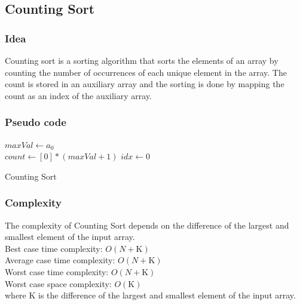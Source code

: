 \documentclass[11pt,a4paper]{article}
\begin{document}
\subsection{Counting Sort}
\subsubsection*{Idea}
Counting sort is a sorting algorithm that sorts the elements of an array by counting the number of occurrences of each unique element in the array. 
The count is stored in an auxiliary array and the sorting is done by mapping the count as an index of the auxiliary array.

\subsubsection*{Pseudo code}
\begin{algorithm2e}
  \SetAlgoLined
  $maxVal \gets a_0$\\
  $count \gets [0]*(maxVal+1)$ 
  $idx \gets 0$\\
  
  \caption{Counting Sort}
\end{algorithm2e}

\subsubsection*{Complexity}
The complexity of Counting Sort depends on the difference of the largest and smallest element of the input array.\\
Best case time complexity: $O(N + \text{K})$ \\
Average case time complexity: $O(N + \text{K})$\\
Worst case time complexity: $O(N + \text{K})$ \\
Worst case space complexity: $O(\text{K})$\\
where K is the difference of the largest and smallest element of the input array.
\end{document}
